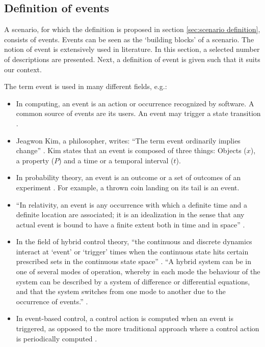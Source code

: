 \subsection{Definition of events}
\label{sec:events}
A scenario, for which the definition is proposed in section \ref{sec:scenario definition}, consists of events. Events can be seen as the `building blocks' of a scenario. The notion of event is extensively used in literature. In this section, a selected number of descriptions are presented. Next, a definition of event is given such that it suits our context.

The term event is used in many different fields, e.g.:
\begin{itemize}
	\item In computing, an event is an action or occurrence recognized by software. A common source of events are its users. An event may trigger a state transition \cite{breu1997towards}.
	\item Jeagwon Kim, a philosopher, writes: ``The term event ordinarily implies change'' \cite{kim1993supervenience}. Kim states that an event is composed of three things: Objects ($x$), a property ($P$) and a time or a temporal interval ($t$). 
	\item In probability theory, an event is an outcome or a set of outcomes of an experiment \cite{pfeiffer2013concepts}. For example, a thrown coin landing on its tail is an event.
	\item ``In relativity, an event is any occurrence with which a definite time and a definite location are associated; it is an idealization in the sense that any actual event is bound to have a finite extent both in time and in space'' \cite{sartori1996understanding}.
	\item In the field of hybrid control theory, ``the continuous and discrete dynamics interact at `event' or `trigger' times when the continuous state hits certain prescribed sets in the continuous state space'' \cite{branicky1998hybridcontrol}. ``A hybrid system can be in one of several modes of operation, whereby in each mode the behaviour of the system can be described by a system of difference or differential equations, and that the system switches from one mode to another due to the occurrence of events.'' \cite{deschutter2003hybrid}.
	\item In event-based control, a control action is computed when an event is triggered, as opposed to the more traditional approach where a control action is periodically computed \cite{heemels2012eventcontrol}. 
\end{itemize}

